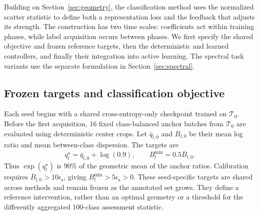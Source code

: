 \documentclass[10pt,a4paper,twocolumn]{article}
\newcommand{\epss}{\epsilon_{\mathrm{s}}}
\begin{document}
\begin{samepage}
Building on Section~\ref{sec:geometry}, the classification method uses
the normalized scatter statistic to define both a representation loss
and the feedback that adjusts its strength. The construction has two
time scales: coefficients act within training phases, while label
acquisition occurs between phases. We first specify the shared objective
and frozen reference targets, then the deterministic and learned
controllers, and finally their integration into active learning.
The spectral task variants use the separate formulation in
Section~\ref{sec:spectral}.
\par
\end{samepage}

\subsection{Frozen targets and classification objective}
\label{sec:aligned_objective}

Each seed begins with a shared cross-entropy-only checkpoint trained
on $\mathcal T_0$. Before the first acquisition, 16 fixed class-balanced
anchor batches from $\mathcal T_0$ are evaluated using deterministic
center crops. Let $\overline q_{l,0}$ and $\overline B_{l,0}$ be their
mean log ratio and mean between-class dispersion. The targets are
\begin{equation}
 q_l^\star=\overline q_{l,0}+\log(0.9),
 \qquad B_l^{\min}=0.5\overline B_{l,0}.
 \label{eq:targets}
\end{equation}
Thus $\exp(q_l^\star)$ is 90\% of the geometric mean of the anchor
ratios. Calibration requires $\overline B_{l,0}>10\epss$, giving
$B_l^{\min}>5\epss>0$. These seed-specific targets are shared across
methods and remain frozen as the annotated set grows. They define a
reference intervention, rather than an optimal geometry or a threshold
for the differently aggregated 100-class assessment statistic.
\end{document}
